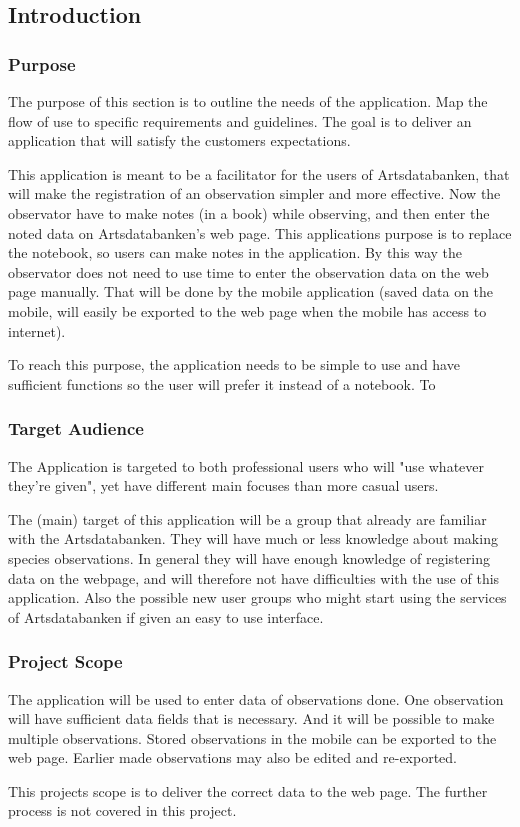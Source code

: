 \subsection{Introduction}
\subsubsection{ Purpose}
	The purpose of this section is to outline the needs of the application. Map the flow of use to specific requirements and guidelines. The goal is to deliver an application that will satisfy the customers expectations.  

This application is meant to be a facilitator for the users of Artsdatabanken, that will make the registration of an observation simpler and more effective. Now the observator have to make notes (in a book) while observing, and then enter the noted data on Artsdatabanken's web page. This applications purpose is to replace the notebook, so users can make notes in the application. By this way the observator does not need to use time to enter the observation data on the web page manually. That will be done by the mobile application (saved data on the mobile, will easily be exported to the web page when the mobile has access to internet). 

To reach this purpose, the application needs to be simple to use and have sufficient functions so the user will prefer it instead of a notebook. 
To  
\subsubsection{ Target Audience}
	The Application is targeted to both professional users who will "use whatever they're given", yet have different main focuses than more casual users.

The (main) target of this application will be a group that already are familiar with the Artsdatabanken. They will have much or less knowledge about making species observations. In general they will have enough knowledge of registering data on the webpage, and will therefore not have difficulties with the use of this application. 
 Also the possible new user groups who might start using the services of Artsdatabanken if given an easy to use interface.


\subsubsection{ Project Scope}
The application will be used to enter data of observations done. One observation will have sufficient data fields that is necessary. And it will be possible to make multiple observations. Stored observations in the mobile can be exported to the web page. Earlier made observations may also be edited and re-exported.

This projects scope is to deliver the correct data to the web page. The further process is not covered in this project.


\pagebreak